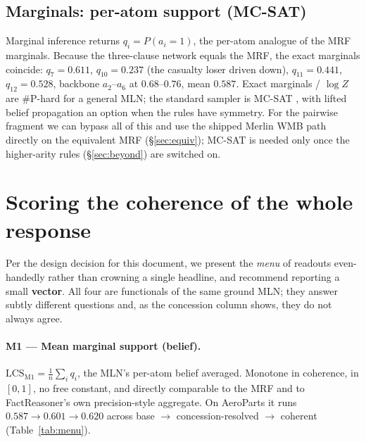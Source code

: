 \documentclass[11pt]{article}
\begin{document}
\subsection{Marginals: per-atom support (MC-SAT)}
Marginal inference returns $q_i=P(a_i{=}1)$, the per-atom analogue of the MRF marginals.
Because the three-clause network equals the MRF, the exact marginals coincide:
$q_7{=}0.611$, $q_{10}{=}0.237$ (the casualty loser driven down), $q_{11}{=}0.441$,
$q_{12}{=}0.528$, backbone $a_2$--$a_6$ at $0.68$--$0.76$, mean $0.587$. Exact marginals /
$\log Z$ are \#P-hard for a general MLN; the standard sampler is MC-SAT \citep{mln}, with
lifted belief propagation an option when the rules have symmetry. For the pairwise fragment
we can bypass all of this and use the shipped Merlin WMB path directly on the equivalent MRF
(\S\ref{sec:equiv}); MC-SAT is needed only once the higher-arity rules
(\S\ref{sec:beyond}) are switched on.

\section{Scoring the coherence of the whole response}
\label{sec:scoring}

Per the design decision for this document, we present the \emph{menu} of readouts
even-handedly rather than crowning a single headline, and recommend reporting a small
\textbf{vector}. All four are functionals of the same ground MLN; they answer subtly
different questions and, as the concession column shows, they do not always agree.

\paragraph{M1 --- Mean marginal support (belief).}
$\mathrm{LCS}_{\text{M1}}=\frac1n\sum_i q_i$, the MLN's per-atom belief averaged. Monotone
in coherence, in $[0,1]$, no free constant, and directly comparable to the MRF and to
FactReasoner's own precision-style aggregate. On AeroParts it runs
$0.587\to0.601\to0.620$ across base $\to$ concession-resolved $\to$ coherent (Table~\ref{tab:menu}).
\end{document}
